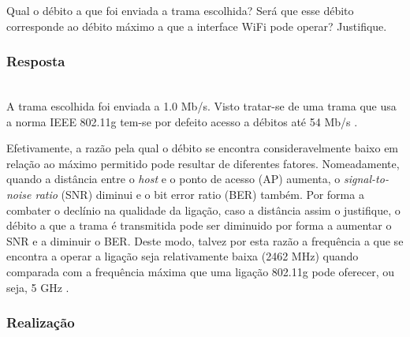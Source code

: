 \documentclass{llncs}
\begin{document}
Qual o débito a que foi enviada a trama escolhida? Será que esse débito corresponde ao débito máximo a que a interface WiFi pode operar? Justifique.

\subsubsection{Resposta}\rule[-10pt]{0pt}{10pt}\\

A trama escolhida foi enviada a 1.0 Mb/s. Visto tratar-se de uma trama que usa a norma IEEE 802.11g tem-se por defeito acesso a débitos até 54 Mb/s \cite{computer_networking}.

Efetivamente, a razão pela qual o débito se encontra consideravelmente baixo em relação ao máximo permitido pode resultar de diferentes fatores. Nomeadamente, quando a distância entre o \textit{host} e o ponto de acesso (AP) aumenta, o \textit{signal-to-noise ratio} (SNR) diminui e o bit error ratio (BER) também. Por forma a combater o declínio na qualidade da ligação, caso a distância assim o justifique, o débito a que a trama é transmitida pode ser diminuido por forma a aumentar o SNR e a diminuir o BER. Deste modo, talvez por esta razão a frequência a que se encontra a operar a ligação seja relativamente baixa (2462 MHz) quando comparada com a frequência máxima que uma ligação 802.11g pode oferecer, ou seja, 5 GHz \cite{computer_networking} \cite{wiki:ber} \cite{wiki:snr}.

\subsubsection{Realização}\rule[-10pt]{0pt}{10pt}\\
\end{document}
